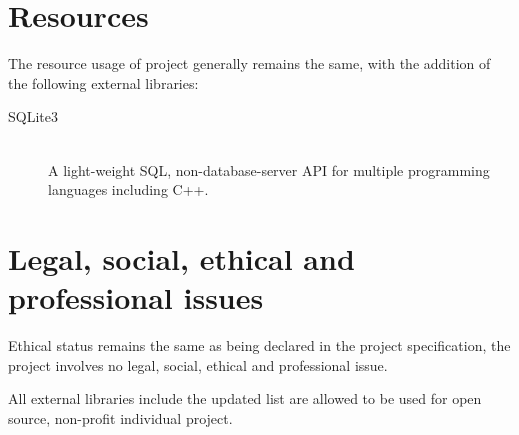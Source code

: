 \documentclass[oneside, a4paper]{article}
\begin{document}
    \section{Resources}
    The resource usage of project generally remains the same, with the addition of the following external libraries:

    \begin{description}
        \item[SQLite3] \hfill \\
            A light-weight SQL, non-database-server API for multiple programming languages including C++.
    \end{description}

    \section{Legal, social, ethical and professional issues}
    Ethical status remains the same as being declared in the project specification, the project involves no legal, social, ethical and professional issue.

    All external libraries include the updated list are allowed to be used for open source, non-profit individual project.

    
    
\end{document}

